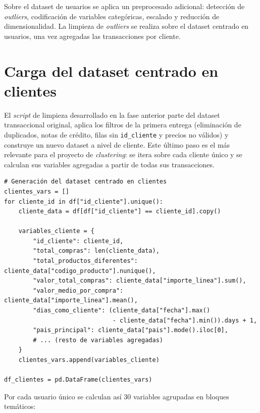 \documentclass[11pt,a4paper]{article}
\begin{document}
Sobre el dataset de usuarios se aplica un preprocesado adicional: detección de \textit{outliers}, codificación de variables categóricas, escalado y reducción de dimensionalidad. La limpieza de \textit{outliers} se realiza sobre el dataset centrado en usuarios, una vez agregadas las transacciones por cliente.

\section{Carga del dataset centrado en clientes}

El \textit{script} de limpieza desarrollado en la fase anterior parte del dataset transaccional original, aplica los filtros de la primera entrega (eliminación de duplicados, notas de crédito, filas sin \texttt{id\_cliente} y precios no válidos) y construye un nuevo dataset a nivel de cliente. Este último paso es el más relevante para el proyecto de \textit{clustering}: se itera sobre cada cliente único y se calculan sus variables agregadas a partir de todas sus transacciones.

\begin{lstlisting}
# Generación del dataset centrado en clientes
clientes_vars = []
for cliente_id in df["id_cliente"].unique():
    cliente_data = df[df["id_cliente"] == cliente_id].copy()

    variables_cliente = {
        "id_cliente": cliente_id,
        "total_compras": len(cliente_data),
        "total_productos_diferentes": cliente_data["codigo_producto"].nunique(),
        "valor_total_compras": cliente_data["importe_linea"].sum(),
        "valor_medio_por_compra": cliente_data["importe_linea"].mean(),
        "dias_como_cliente": (cliente_data["fecha"].max()
                              - cliente_data["fecha"].min()).days + 1,
        "pais_principal": cliente_data["pais"].mode().iloc[0],
        # ... (resto de variables agregadas)
    }
    clientes_vars.append(variables_cliente)

df_clientes = pd.DataFrame(clientes_vars)
\end{lstlisting}

\noindent Por cada usuario único se calculan así 30 variables agrupadas en bloques temáticos:
\end{document}
